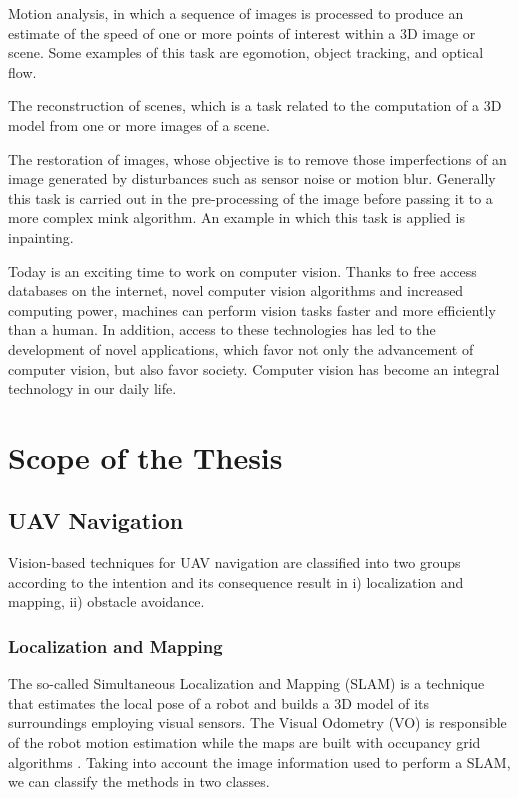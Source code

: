 Motion analysis, in which a sequence of images is processed to produce an estimate of the speed of one or more points of interest within a 3D image or scene. Some examples of this task are egomotion, object tracking, and optical flow.

The reconstruction of scenes, which is a task related to the computation of a 3D model from one or more images of a scene.

The restoration of images, whose objective is to remove those imperfections of an image generated by disturbances such as sensor noise or motion blur. Generally this task is carried out in the pre-processing of the image before passing it to a more complex mink algorithm. An example in which this task is applied is inpainting.

Today is an exciting time to work on computer vision. Thanks to free access databases on the internet, novel computer vision algorithms and increased computing power, machines can perform vision tasks faster and more efficiently than a human. In addition, access to these technologies has led to the development of novel applications, which favor not only the advancement of computer vision, but also favor society. Computer vision has become an integral technology in our daily life.

\section{Scope of the Thesis}




\subsection{UAV Navigation}
Vision-based techniques for UAV navigation are classified into two groups according to the intention and its consequence result in i) localization and mapping, ii) obstacle avoidance.

\subsubsection{Localization and Mapping}
The so-called Simultaneous Localization and Mapping (SLAM) is a technique that estimates the local pose of a robot and builds a 3D model of its surroundings employing visual sensors. The Visual Odometry (VO) \cite{Scaramuzza.Fraundorfer:RAM:2011} is responsible of the robot motion estimation while the maps are built with occupancy grid algorithms \cite{Thrun.Bu:AI:1996}. Taking into account the image information used to perform a SLAM, we can classify the methods in two classes.

